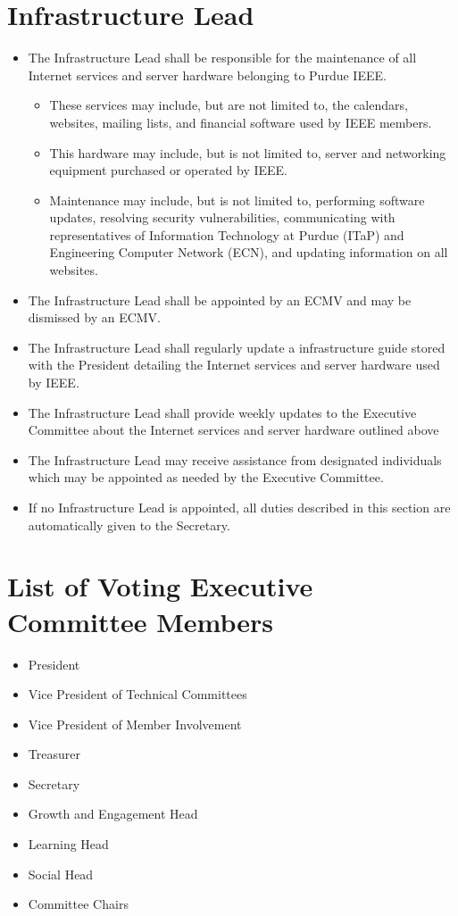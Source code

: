 \documentclass[12pt]{constitution}
\begin{document}
\section{Infrastructure Lead}
\label{sec:infra_lead}
\begin{itemize}
    \item The Infrastructure Lead shall be responsible for the maintenance of all Internet services and server hardware belonging to Purdue IEEE.
        \begin{itemize}
            \item These services may include, but are not limited to, the calendars, websites, mailing lists, and financial software used by IEEE members.
            \item This hardware may include, but is not limited to, server and networking equipment purchased or operated by IEEE.
            \item Maintenance may include, but is not limited to, performing software updates, resolving security vulnerabilities, communicating with representatives of Information Technology at Purdue (ITaP) and Engineering Computer Network (ECN), and updating information on all websites.
        \end{itemize}
    \item The Infrastructure Lead shall be appointed by an ECMV and may be dismissed by an ECMV.
    \item The Infrastructure Lead shall regularly update a infrastructure guide stored with the President detailing the Internet services and server hardware used by IEEE.
    \item The Infrastructure Lead shall provide weekly updates to the Executive Committee about the Internet services and server hardware outlined above
    \item The Infrastructure Lead may receive assistance from designated individuals which may be appointed as needed by the Executive Committee.
    \item If no Infrastructure Lead is appointed, all duties described in this section are automatically given to the Secretary.
\end{itemize}


\label{art:officers}

\section{List of Voting Executive Committee Members}
\label{sec:officer_list}
\begin{itemize}
    \item President
    \item Vice President of Technical Committees
    \item Vice President of Member Involvement
    \item Treasurer
    \item Secretary
    \item Growth and Engagement Head
    \item Learning Head
    \item Social Head
    \item Committee Chairs
\end{itemize}
\end{document}
